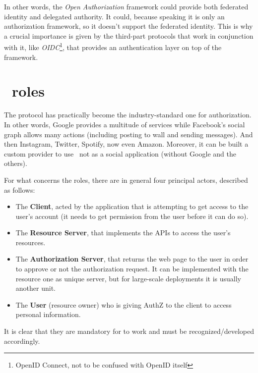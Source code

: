 In other words, the \textit{Open Authorization} framework could provide both federated identity and delegated authority. It could, because speaking it is only an authorization framework, so it doesn't support the federated identity. This is why a crucial importance is given by the third-part protocols that work in conjunction with it, like \textit{OIDC}\footnote{OpenID Connect, not to be confused with OpenID itself}, that provides an authentication layer on top of the \textit{\oauth} framework.


\section{\oauth\ roles}
The protocol has practically become the industry-standard one for authorization. In other words, Google provides a multitude of services while Facebook's social graph allows many actions (including posting to wall and sending messages). And then Instagram, Twitter, Spotify, now even Amazon. Moreover, it can be built a custom provider to use \oauth\ not as a social application (without Google and the others).

For what concerns the roles, there are in general four principal actors, described as follows:


\begin{itemize}
    \item The \textbf{Client}, acted by the application that is attempting to get access to the user's account (it needs to get permission from the user before it can do so).
    \item The \textbf{Resource Server}, that implements the APIs to access the user's resources.
    \item The \textbf{Authorization Server}, that returns the web page to the user in order to approve or not the authorization request. It can be implemented with the resource one as unique server, but for large-scale deployments it is usually another unit.
    \item The \textbf{User} (resource owner) who is giving AuthZ to the client to access personal information.
\end{itemize}

It is clear that they are mandatory for \textit{\oauth} to work and must be recognized/developed accordingly. 



\vspace{0.5cm}
